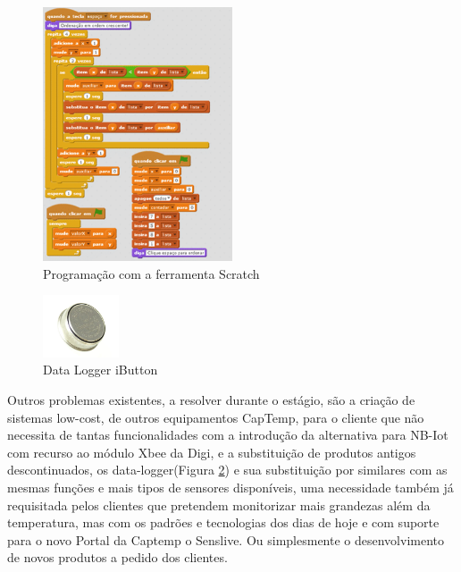 \begin{figure}[ht]
  \centering
  \includegraphics[width=0.50\textwidth]{images/scratch.png}
  \caption{ Programação com a ferramenta Scratch}\label{scratch}
\end{figure}
\begin{figure}[htb]
  \centering
  \includegraphics[width=0.20\textwidth]{images/ds1921.jpg}
  \caption{Data Logger iButton}\label{ds1921}
\end{figure}
Outros problemas existentes, a resolver durante o estágio, são a criação de sistemas low-cost, de outros equipamentos CapTemp, para o cliente que não necessita de tantas funcionalidades com a introdução da alternativa para NB-Iot com recurso ao módulo Xbee da Digi, e a substituição de produtos antigos descontinuados, os data-logger(Figura \ref{ds1921}) e sua substituição por similares com as mesmas funções e mais tipos de sensores disponíveis, uma necessidade também já requisitada pelos clientes que pretendem monitorizar mais grandezas além da temperatura, mas com os padrões e tecnologias dos dias de hoje e com suporte para o novo Portal da Captemp o Senslive. Ou simplesmente o desenvolvimento de novos produtos a pedido dos clientes.

